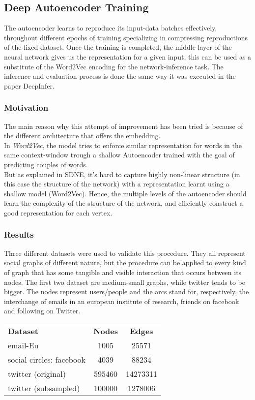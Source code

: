 \documentclass{article}
\begin{document}
			\subsection{Deep Autoencoder Training}
			The autoencoder learns to reproduce its input-data batches effectively, throughout different epochs of training specializing in compressing reproductions of the fixed dataset. Once the training is completed, the middle-layer of the neural network gives us the representation for a given input; this can be used as a substitute of the Word2Vec encoding for the network-inference task. The inference and evaluation process is done the same way it was executed in the paper DeepInfer.
			
				\subsubsection{Motivation}
				The main reason why this attempt of improvement has been tried is because of the different architecture that offers the embedding.\\
				In \textit{Word2Vec}, the model tries to enforce similar representation for words in the same context-window trough a shallow Autoencoder trained with the goal of predicting couples of words.\\
				But as explained in SDNE, it's hard to capture highly non-linear structure (in this case the structure of the network) with a representation learnt using a shallow model (Word2Vec). Hence, the multiple levels of the autoencoder should learn the complexity of the structure of the network, and efficiently construct a good representation for each vertex.
				
				\subsubsection{Results}
				Three different datasets were used to validate this procedure. They all represent social graphs of different nature, but the procedure can be applied to every kind of graph that has some tangible and visible interaction that occurs between its nodes. The first two dataset are medium-small graphs, while twitter tends to be bigger. The nodes represent users/people and the arcs stand for, respectively, the interchange of emails in an european institute of research, friends on facebook and following on Twitter.
				\begin{center}
					\begin{tabular}{l | c | c}
						\textbf{Dataset} & \textbf{Nodes} & \textbf{Edges} \\
						email-Eu & 1005 & 25571 \\
						social circles: facebook & 4039 & 88234 \\
						twitter (original) & 595460 & 14273311\\
						twitter (subsampled) & 100000 & 1278006
					\end{tabular}	
				\end{center}
			
\end{document}

